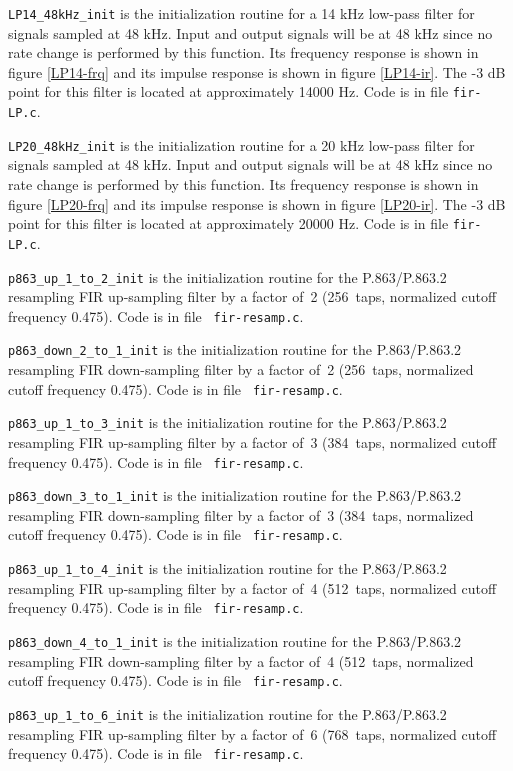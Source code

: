 {\tt LP14\_48kHz\_init} is the initialization routine for a 14 kHz
low-pass filter for signals sampled at 48 kHz. Input and output
signals will be at 48 kHz since no rate change is performed by this
function. Its frequency response is shown in figure \ref{LP14-frq}
and its impulse response is shown in figure \ref{LP14-ir}. The -3 dB
point for this filter is located at approximately 14000 Hz. Code is
in file {\tt fir-LP.c}.

{\tt LP20\_48kHz\_init} is the initialization routine for a 20 kHz
low-pass filter for signals sampled at 48 kHz. Input and output
signals will be at 48 kHz since no rate change is performed by this
function. Its frequency response is shown in figure \ref{LP20-frq}
and its impulse response is shown in figure \ref{LP20-ir}. The -3 dB
point for this filter is located at approximately 20000 Hz. Code is
in file {\tt fir-LP.c}.

{\tt p863\_up\_1\_to\_2\_init} is the initialization routine for the
P.863/P.863.2 resampling FIR up-sampling filter by a factor of~2
(256~taps, normalized cutoff frequency 0.475). Code is in file {\tt
fir-resamp.c}.

{\tt p863\_down\_2\_to\_1\_init} is the initialization routine for the
P.863/P.863.2 resampling FIR down-sampling filter by a factor of~2
(256~taps, normalized cutoff frequency 0.475). Code is in file {\tt
fir-resamp.c}.

{\tt p863\_up\_1\_to\_3\_init} is the initialization routine for the
P.863/P.863.2 resampling FIR up-sampling filter by a factor of~3
(384~taps, normalized cutoff frequency 0.475). Code is in file {\tt
fir-resamp.c}.

{\tt p863\_down\_3\_to\_1\_init} is the initialization routine for the
P.863/P.863.2 resampling FIR down-sampling filter by a factor of~3
(384~taps, normalized cutoff frequency 0.475). Code is in file {\tt
fir-resamp.c}.

{\tt p863\_up\_1\_to\_4\_init} is the initialization routine for the
P.863/P.863.2 resampling FIR up-sampling filter by a factor of~4
(512~taps, normalized cutoff frequency 0.475). Code is in file {\tt
fir-resamp.c}.

{\tt p863\_down\_4\_to\_1\_init} is the initialization routine for the
P.863/P.863.2 resampling FIR down-sampling filter by a factor of~4
(512~taps, normalized cutoff frequency 0.475). Code is in file {\tt
fir-resamp.c}.

{\tt p863\_up\_1\_to\_6\_init} is the initialization routine for the
P.863/P.863.2 resampling FIR up-sampling filter by a factor of~6
(768~taps, normalized cutoff frequency 0.475). Code is in file {\tt
fir-resamp.c}.

